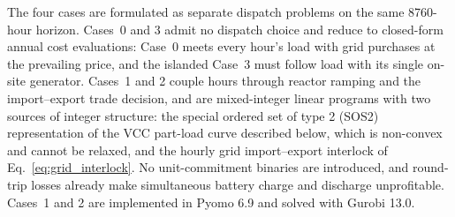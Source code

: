 \documentclass[a4paper,fleqn]{cas-sc}
\begin{document}
The four cases are formulated as separate dispatch problems on the same 8760-hour horizon. Cases~0 and 3 admit no dispatch choice and reduce to closed-form annual cost evaluations: Case~0 meets every hour's load with grid purchases at the prevailing price, and the islanded Case~3 must follow load with its single on-site generator. Cases~1 and 2 couple hours through reactor ramping and the import--export trade decision, and are mixed-integer linear programs with two sources of integer structure: the special ordered set of type 2 (SOS2) representation of the VCC part-load curve described below, which is non-convex and cannot be relaxed, and the hourly grid import--export interlock of Eq.~\eqref{eq:grid_interlock}. No unit-commitment binaries are introduced, and round-trip losses already make simultaneous battery charge and discharge unprofitable. Cases~1 and 2 are implemented in Pyomo 6.9 and solved with Gurobi 13.0.%
\end{document}
